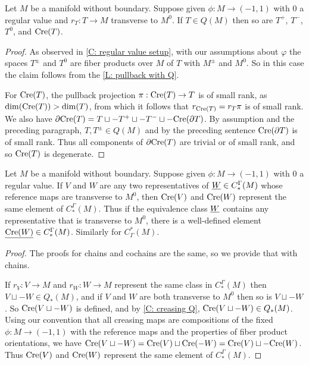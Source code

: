 \begin{corollary}\label{C: creasing Q}
Let $M$ be a manifold without boundary. Suppose given $\phi:M\to (-1,1)$ with $0$ a regular value and $r_T:T\to M$ transverse to $M^0$. If $T\in Q(M)$ then so are $T^+$,  $T^-$, $T^0$, and $\mathrm{Cre}(T)$.
\end{corollary}
\begin{proof}
As observed in \cref{C: regular value setup}, with our assumptions about $\varphi$ the spaces $T^\pm$ and $T^0$ are fiber products over $M$ of $T$ with $M^\pm$ and $M^0$. So in this case the claim follows from the \cref{L: pullback with Q}.

For $\mathrm{Cre}(T)$, the pullback projection $\pi:\mathrm{Cre}(T)\to T$ is of small rank, as $\dim(\mathrm{Cre}(T))>\dim(T)$, from which it follows that $r_{\mathrm{Cre}(T)}=r_T\pi$ is of small rank. We also have $\partial \mathrm{Cre}(T)=T\sqcup - T^+\sqcup -T^-\sqcup -\mathrm{Cre}(\partial T)$. By assumption and the preceding paragraph, $T, T^\pm\in Q(M)$ and by the preceding sentence $\mathrm{Cre}(\partial T)$ is of small rank. Thus all components of $\partial \mathrm{Cre}(T)$ are trivial or of small rank, and so $\mathrm{Cre}(T)$ is degenerate.
\end{proof}

\begin{proposition}
Let $M$ be a manifold without boundary. Suppose given $\phi:M\to (-1,1)$ with $0$ a regular value. If $V$ and $W$ are any two representatives of $\underline{W}\in C_*^\Gamma(M)$ whose reference maps are transverse to $M^0$, then $\mathrm{Cre}(V)$ and $\mathrm{Cre}(W)$ represent the same element of $C_*^\Gamma(M)$. Thus if the equivalence class $\underline{W}$ contains any representative that is transverse to $M^0$, there is a well-defined element $\underline{\mathrm{Cre}(W)}\in C_*^\Gamma(M)$. Similarly for $C^*_\Gamma(M)$.
\end{proposition}
\begin{proof}
The proofs for chains and cochains are the same, so we provide that with chains.

If $r_V:V\to M$ and $r_W:W\to M$ represent the same class in $C_*^\Gamma(M)$ then $V\sqcup -W\in Q_*(M)$, and if $V$ and $W$ are both transverse to $M^0$ then so is $V\sqcup -W$. So  $\mathrm{Cre}(V\sqcup-W)$ is defined, and by \cref{C: creasing Q}, $\mathrm{Cre}(V\sqcup -W)\in Q_*(M)$. Using our convention that all creasing maps are compositions of the fixed $\phi:M\to (-1,1)$ with the reference maps and the properties of fiber product orientations, we have $\mathrm{Cre}(V\sqcup -W)=\mathrm{Cre}(V)\sqcup \mathrm{Cre}(-W)=\mathrm{Cre}(V)\sqcup -\mathrm{Cre}(W)$. Thus $\mathrm{Cre}(V)$ and $\mathrm{Cre}(W)$ represent the same element of  $C_*^\Gamma(M)$.
\end{proof}

